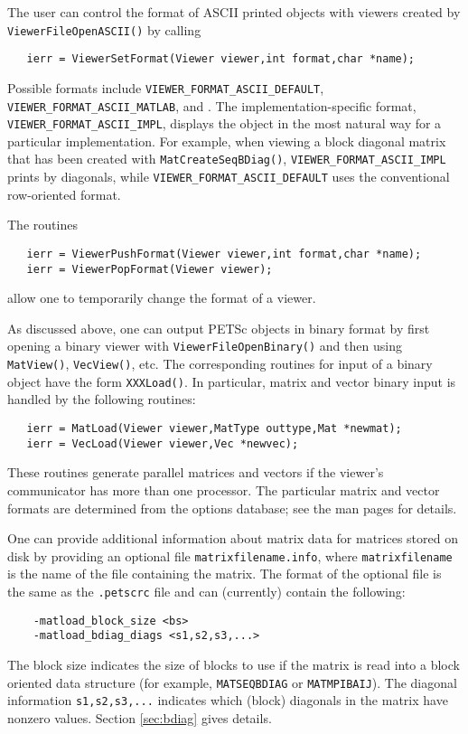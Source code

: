 The user can control the format of ASCII printed objects with viewers 
created by {\tt ViewerFileOpenASCII()} by calling
\begin{verbatim}
   ierr = ViewerSetFormat(Viewer viewer,int format,char *name);
\end{verbatim}  
  
 
Possible formats include 
{\tt VIEWER\_FORMAT\_ASCII\_DEFAULT}, {\tt VIEWER\_FORMAT\_ASCII\_MATLAB}, and
.  The implementation-specific format, 
{\tt VIEWER\_FORMAT\_ASCII\_IMPL}, displays the object in the most natural way
for a particular implementation.  For example, when viewing a block 
diagonal matrix that has been created with {\tt MatCreateSeqBDiag()},
{\tt VIEWER\_FORMAT\_ASCII\_IMPL} prints by diagonals, while {\tt VIEWER\_FORMAT\_ASCII\_DEFAULT}
uses the conventional row-oriented format.

The routines
\begin{verbatim}
   ierr = ViewerPushFormat(Viewer viewer,int format,char *name);
   ierr = ViewerPopFormat(Viewer viewer);
\end{verbatim} 
allow one to temporarily change the format of a viewer.
 

As discussed above, one can output PETSc objects in binary format by
first opening a binary viewer with {\tt ViewerFileOpenBinary()} and
then using {\tt MatView()}, {\tt VecView()}, etc.  The corresponding
routines for input of a binary object have the form {\tt XXXLoad()}.  In
particular, matrix and vector binary input is handled by the
following routines:  
\begin{verbatim}
   ierr = MatLoad(Viewer viewer,MatType outtype,Mat *newmat);
   ierr = VecLoad(Viewer viewer,Vec *newvec);
\end{verbatim}
These routines generate parallel matrices and vectors if the viewer's
communicator has more than one processor.  The particular matrix and
vector formats are determined from the options database; see the
man pages for details.

One can provide additional information about matrix data for matrices
stored on disk by providing an optional file {\tt matrixfilename.info},
where {\tt matrixfilename} is the name of the file containing the matrix.
The format of the optional file is the same as the {\tt .petscrc} file 
and can (currently) contain the following:
\begin{verbatim}
    -matload_block_size <bs>
    -matload_bdiag_diags <s1,s2,s3,...>
\end{verbatim}
The block size indicates the size of blocks to use if the matrix is
read into a block oriented data structure (for example, 
{\tt MATSEQBDIAG} or {\tt MATMPIBAIJ}). The diagonal information 
{\tt s1,s2,s3,...} indicates
which (block) diagonals in the matrix have nonzero values.
Section \ref{sec:bdiag} gives details.


